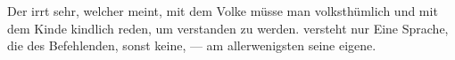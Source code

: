Der irrt sehr, welcher meint, mit dem Volke müsse man volksthümlich und mit dem Kinde kindlich reden, um verstanden zu werden.  versteht nur Eine Sprache, die des Befehlenden, sonst keine, — am allerwenigsten seine eigene.
\par

